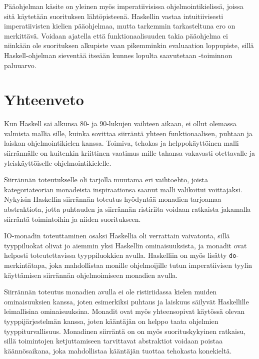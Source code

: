 \documentclass[finnish]{tktltiki2}
\begin{document}
Pääohjelman käsite on yleinen myös imperatiivisissa ohjelmointikielissä, joissa sitä käytetään
suorituksen lähtöpisteenä. Haskellin  vastaa intuitiivisesti imperatiivisten kielien
pääohjelmaa, mutta tarkemmin tarkasteltuna ero on merkittävä. Voidaan ajatella että
funktionaalisuuden takia pääohjelma ei niinkään ole suorituksen alkupiste vaan pikemminkin
evaluaation loppupiste, sillä Haskell-ohjelman sieventää itseään kunnes lopulta saavutetaan
-toiminnon paluuarvo.


\section{Yhteenveto}

Kun Haskell sai alkunsa 80- ja 90-lukujen vaihteen aikaan, ei ollut olemassa valmista mallia sille,
kuinka sovittaa siirräntä yhteen funktionaalisen, puhtaan ja laiskan ohjelmointikielen kanssa.
Toimiva, tehokas ja helppokäyttöinen malli siirrännälle on kuitenkin kriittinen vaatimus mille
tahansa vakavasti otettavalle ja yleiskäyttöiselle ohjelmointikielelle.


Siirrännän toteutukselle oli tarjolla muutama eri vaihtoehto, joista kategoriateorian monadeista
inspiraationsa saanut malli valikoitui voittajaksi. Nykyisin Haskellin siirrännän toteutus hyödyntää
monadien tarjoamaa abstraktiota, jotta puhtauden ja siirrännän ristiriita voidaan ratkaista
jakamalla siirräntä toimintoihin ja niiden suoritukseen.


IO-monadin toteuttaminen osaksi Haskellia oli verrattain vaivatonta, sillä tyyppiluokat olivat jo
aiemmin yksi Haskellin ominaisuuksista, ja monadit ovat helposti toteutettavissa tyyppiluokkien
avulla. Haskelliin on myös lisätty \verb|do|-merkintätapa, joka mahdollistaa monille ohjelmoijille
tutun imperatiivisen tyylin käyttämisen siirrännän ohjelmoimiseen monadien avulla.

Siirrännän toteutus monadien avulla ei ole ristiriidassa kielen muiden ominaisuuksien kanssa, joten
esimerkiksi puhtaus ja laiskuus säilyvät Haskellille leimallisina ominaisuuksina. Monadit ovat myös
yhteensopivat käytössä olevan tyyppijärjestelmän kanssa, joten kääntäjän on helppo taata ohjelmien
tyyppiturvallisuus. Monadinen siirräntä on on myös suorituskykyinen ratkaisu, sillä toimintojen
ketjuttamiseen tarvittavat abstraktiot voidaan poistaa käännösaikana, joka mahdollistaa kääntäjän
tuottaa tehokasta konekieltä.
\end{document}
